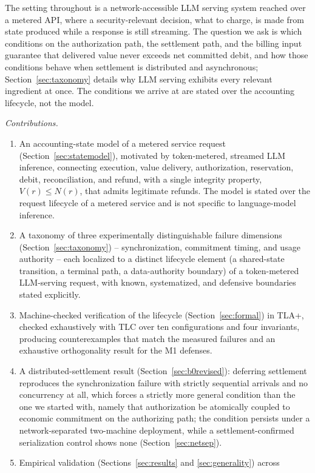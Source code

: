 \documentclass[manuscript,review]{acmart}
\begin{document}
The setting throughout is a network-accessible LLM serving system reached over a metered
API, where a security-relevant decision, what to charge, is made from state produced
while a response is still streaming. The question we ask is which conditions on the
authorization path, the settlement path, and the billing input guarantee that delivered
value never exceeds net committed debit, and how those conditions behave when settlement
is distributed and asynchronous; Section~\ref{sec:taxonomy} details why LLM serving
exhibits every relevant ingredient at once. The conditions we arrive at are stated over
the accounting lifecycle, not the model.

\textit{Contributions.}
\begin{enumerate}
\item An accounting-state model of a metered service request
(Section~\ref{sec:statemodel}), motivated by token-metered, streamed LLM inference,
connecting execution, value delivery, authorization,
reservation, debit, reconciliation, and refund, with a single integrity property,
$V(r) \le N(r)$, that admits legitimate refunds. The model is stated over the request
lifecycle of a metered service and is not specific to language-model inference.
\item A taxonomy of three experimentally distinguishable failure dimensions
(Section~\ref{sec:taxonomy}) -- synchronization, commitment timing, and usage authority --
each localized to a distinct lifecycle element (a shared-state transition, a terminal
path, a data-authority boundary) of a token-metered LLM-serving request, with known,
systematized, and defensive boundaries stated explicitly.
\item Machine-checked verification of the lifecycle (Section~\ref{sec:formal}) in TLA+,
checked exhaustively with TLC over ten configurations and four invariants, producing
counterexamples that match the measured failures and an exhaustive orthogonality result
for the M1 defenses.
\item A distributed-settlement result (Section~\ref{sec:b0revised}): deferring settlement
reproduces the synchronization failure with strictly sequential arrivals and no
concurrency at all, which forces a strictly more general condition than the one we
started with, namely that authorization be atomically coupled to economic commitment on
the authorizing path; the condition persists under a network-separated two-machine
deployment, while a settlement-confirmed serialization control shows none
(Section~\ref{sec:netsep}).
\item Empirical validation (Sections~\ref{sec:results} and \ref{sec:generality}) across

\end{enumerate}
\end{document}
